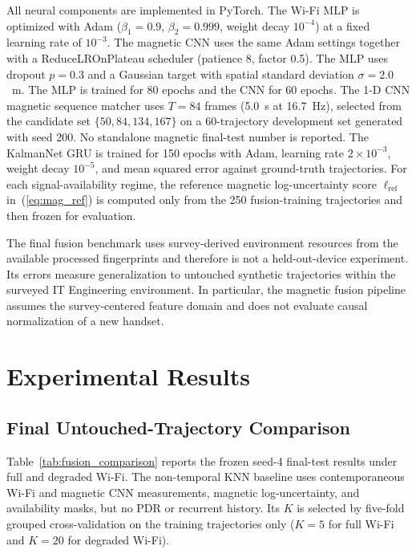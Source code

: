 \documentclass[conference]{IEEEtran}
\begin{document}
All neural components are implemented in PyTorch. The Wi-Fi MLP is optimized with Adam ($\beta_1=0.9$, $\beta_2=0.999$, weight decay $10^{-4}$) at a fixed learning rate of $10^{-3}$. The magnetic CNN uses the same Adam settings together with a ReduceLROnPlateau scheduler (patience 8, factor 0.5). The MLP uses dropout $p=0.3$ and a Gaussian target with spatial standard deviation $\sigma=2.0$~m. The MLP is trained for 80 epochs and the CNN for 60 epochs. The 1-D CNN magnetic sequence matcher uses $T=84$ frames (5.0~s at 16.7~Hz), selected from the candidate set $\{50,84,134,167\}$ on a 60-trajectory development set generated with seed 200. No standalone magnetic final-test number is reported. The KalmanNet GRU is trained for 150 epochs with Adam, learning rate $2\times10^{-3}$, weight decay $10^{-5}$, and mean squared error against ground-truth trajectories. For each signal-availability regime, the reference magnetic log-uncertainty score $\ell_{\mathrm{ref}}$ in~(\ref{eq:mag_ref}) is computed only from the 250 fusion-training trajectories and then frozen for evaluation.

The final fusion benchmark uses survey-derived environment resources from the available processed fingerprints and therefore is not a held-out-device experiment. Its errors measure generalization to untouched synthetic trajectories within the surveyed IT Engineering environment. In particular, the magnetic fusion pipeline assumes the survey-centered feature domain and does not evaluate causal normalization of a new handset.

\section{Experimental Results}\label{sec:results}

\subsection{Final Untouched-Trajectory Comparison}

Table~\ref{tab:fusion_comparison} reports the frozen seed-4 final-test results under full and degraded Wi-Fi. The non-temporal KNN baseline uses contemporaneous Wi-Fi and magnetic CNN measurements, magnetic log-uncertainty, and availability masks, but no PDR or recurrent history. Its $K$ is selected by five-fold grouped cross-validation on the training trajectories only ($K=5$ for full Wi-Fi and $K=20$ for degraded Wi-Fi).
\end{document}
